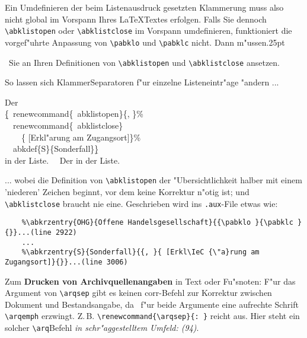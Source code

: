 \documentclass[12pt,a4paper]{article}
\newcommand{\pdfko}[1]{\kern #1pt
                          \strut\ignorespaces}%
\newcommand{\pbs}{\string\ \unskip}
\newcommand{\bs}{\protect\pbs}
\begin{document}
\vspace{-2.5ex}
  {\renewcommand{\pabklo}{\bastrut\ \balistcorr =\ }
   \renewcommand{\pabklc}{!}
   \renewcommand{\abklistemph}{\itshape}
   \showbacorr \small \batwocolitemdefs\printnumabklist}

\noindent
Ein Umdefinieren der beim Listenausdruck 
gesetzten Klammerung muss also nicht global im Vorspann Ihres 
\LaTeX\hy Textes erfolgen. Falls Sie dennoch \verb|\abklistopen| 
oder \verb|\abklistclose| im Vorspann umdefinieren,
funktioniert die vorgef"uhrte Anpassung von \verb|\pabklo| 
und \verb|\pabklc| nicht. Dann m"ussen\pdfko{.25}\ Sie an Ihren 
Definitionen von \verb|\abklistopen| und \verb|\abklistclose| 
ansetzen.

\vspace{1ex}\noindent
So lassen sich Klammer\hy Separatoren f"ur einzelne 
Listeneintr"age "andern ...

\vspace{-.2ex}
\Doppelbox
{\vspace{.3ex}
 Der 
 \\ \b{\{}\bs renewcommand\{\bs abklistopen\}\{, \}\%
 \\ \ \bs renewcommand\{\bs abklistclose\}
 \\ \ \ \ \ \{ [Erkl"arung am Zugangsort]\}\%
 \\ \ \bs abkdef\{S\}\{Sonderfall\}\b{\}} 
 \\ in der Liste.
 \vspace{.3ex}
}
{
 \ \ Der {\renewcommand{\abklistopen}{, }%
  \renewcommand{\abklistclose}{ [Erkl"arung am Zugangsort]}%
 } in der Liste.
}

\vspace{-.2ex}\noindent
... wobei die Definition von \verb|\abklistopen| der "Ubersichtlichkeit 
halber mit einem 'niederen' Zeichen beginnt, 
vor dem keine Korrektur n"otig ist; und \verb|\abklistclose| 
braucht nie eine. Geschrieben wird ins \verb|.aux|-File etwas wie:

\vspace{0.325ex}
{\scriptsize\begin{verbatim}
    %\abkrzentry{OHG}{Offene Handelsgesellschaft}{{\pabklo }{\pabklc }{}}...(line 2922)
    ...
    %\abkrzentry{S}{Sonderfall}{{, }{ [Erkl\IeC {\"a}rung am Zugangsort]}{}}...(line 3006)
\end{verbatim}}


\vspace{2ex}\noindent
Zum \textbf{Drucken von Archivquellenangaben} in Text oder Fu"snoten: F"ur das 
Argument von \verb|\arqsep| gibt es keinen corr-Befehl zur Korrektur 
zwischen Dokument und Bestandsangabe, da \BibArts\ f"ur beide Argumente
eine aufrechte Schrift \verb|\arqemph| erzwingt. Z.\,B. \verb|\renewcommand{\arqsep}{: }| 
reicht aus. Hier steht ein solcher \verb|\arq|\hy Befehl
{\showbacorr\itshape in schr"aggestelltem Umfeld: 
\renewcommand{\arqsep}{: }(94)}. 
\end{document}
